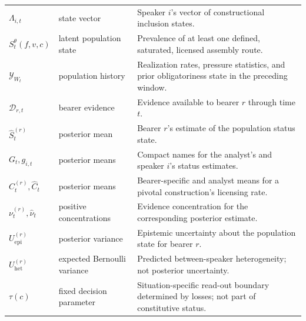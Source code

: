 \begin{longtable}{@{}>{\raggedright\arraybackslash}p{}
  >{\raggedright\arraybackslash}p{}
  >{\raggedright\arraybackslash}p{}@{}}
$\Lambda_{i,t}$ & state vector & Speaker $i$'s vector of constructional inclusion states. \\
$S_t^\theta(f,v,c)$ & latent population state & Prevalence of at least one defined, saturated, licensed assembly route. \\
$\mathcal Y_{W_t}$ & population history & Realization rates, pressure statistics, and prior obligatoriness state in the preceding window. \\
$\mathcal D_{r,t}$ & bearer evidence & Evidence available to bearer $r$ through time $t$. \\
$\widehat S_t^{(r)}$ & posterior mean & Bearer $r$'s estimate of the population status state. \\
$G_t,g_{i,t}$ & posterior means & Compact names for the analyst's and speaker $i$'s status estimates. \\
$C_t^{(r)},\widehat C_t$ & posterior means & Bearer-specific and analyst means for a pivotal construction's licensing rate. \\
$\nu_t^{(r)},\widehat\nu_t$ & positive concentrations & Evidence concentration for the corresponding posterior estimate. \\
$U_{\mathrm{epi}}^{(r)}$ & posterior variance & Epistemic uncertainty about the population state for bearer $r$. \\
$U_{\mathrm{het}}^{(r)}$ & expected Bernoulli variance & Predicted between-speaker heterogeneity; not posterior uncertainty. \\
$\tau(c)$ & fixed decision parameter & Situation-specific read-out boundary determined by losses; not part of constitutive status. \\


\end{longtable}
